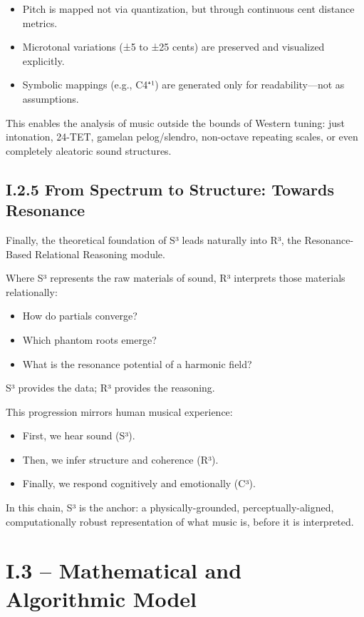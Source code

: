 \begin{itemize}
    \item Pitch is mapped not via quantization, but through continuous cent distance metrics.
    \item Microtonal variations (±5 to ±25 cents) are preserved and visualized explicitly.
    \item Symbolic mappings (e.g., C4⁺¹) are generated only for readability—not as assumptions.
\end{itemize}

This enables the analysis of music outside the bounds of Western tuning: just intonation, 24-TET, gamelan pelog/slendro, non-octave repeating scales, or even completely aleatoric sound structures.

\subsection*{I.2.5 From Spectrum to Structure: Towards Resonance}

Finally, the theoretical foundation of S³ leads naturally into R³, the Resonance-Based Relational Reasoning module.

Where S³ represents the raw materials of sound, R³ interprets those materials relationally:

\begin{itemize}
    \item How do partials converge?
    \item Which phantom roots emerge?
    \item What is the resonance potential of a harmonic field?
\end{itemize}

S³ provides the data; R³ provides the reasoning.

This progression mirrors human musical experience:

\begin{itemize}
    \item First, we hear sound (S³).
    \item Then, we infer structure and coherence (R³).
    \item Finally, we respond cognitively and emotionally (C³).
\end{itemize}

In this chain, S³ is the anchor: a physically-grounded, perceptually-aligned, computationally robust representation of what music is, before it is interpreted.

\section*{I.3 – Mathematical and Algorithmic Model}

